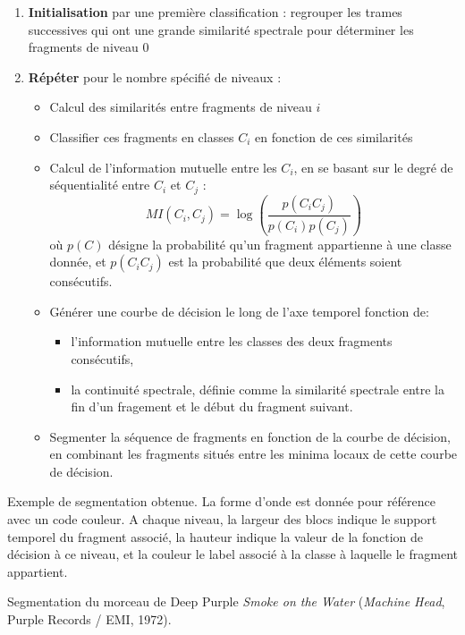 \begin{enumerate}
\item \textbf{Initialisation} par une première classification : regrouper les trames successives qui ont une grande similarité spectrale pour déterminer les fragments de niveau 0
\item \textbf{Répéter} pour le nombre spécifié de niveaux :
  \begin{itemize}
  \item Calcul des similarités entre fragments de niveau $i$
  \item Classifier ces fragments en classes $C_i$ en fonction de ces similarités
  \item Calcul de l'information mutuelle entre les $C_i$, en se basant sur le degré de séquentialité entre $C_i$ et $C_j$ :
    \[ MI \left( C_i, C_j \right) = \log \left(\frac{p\left(C_iC_j\right)}{p\left(C_i\right)p\left(C_j\right)}\right) \]
    où $p(C)$ désigne la probabilité qu'un fragment appartienne à une classe donnée, et $p(C_iC_j)$ est la probabilité que deux éléments soient consécutifs.
  \item Générer une courbe de décision le long de l'axe temporel fonction de:
    \begin{itemize}
    \item l'information mutuelle entre les classes des deux fragments consécutifs,
    \item la continuité spectrale, définie comme la similarité spectrale entre la fin d'un fragement et le début du fragment suivant.
      \end{itemize}
  \item Segmenter la séquence de fragments en fonction de la courbe de décision, en combinant les fragments situés entre les minima locaux de cette courbe de décision.
  \end{itemize}
\end{enumerate}

\label{fig:alcéchantillon}

Exemple de segmentation obtenue. La forme d'onde est donnée pour référence avec un code couleur. A chaque niveau, la largeur des blocs indique le support temporel du fragment associé, la hauteur indique la valeur de la fonction de décision à ce niveau, et la couleur le label associé à la classe à laquelle le fragment appartient.

Segmentation du morceau de Deep Purple \emph{Smoke on the Water} (\emph{Machine Head}, Purple Records / EMI, 1972).


